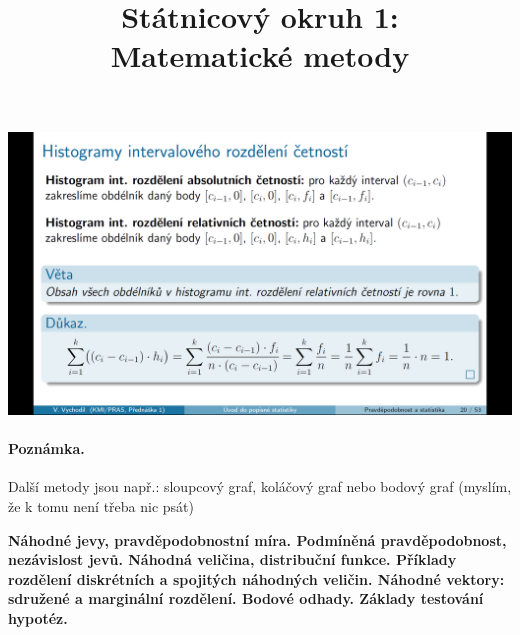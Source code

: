 \begin{center}
	\includegraphics[scale=0.32]{img/graficke_metody_intervalove_rozdeleni_histogramy}
\end{center}
\paragraph{Poznámka.} Další metody jsou např.: sloupcový graf, koláčový graf nebo bodový graf (myslím, že k tomu není třeba nic psát)



\newpage
\textbf{Náhodné jevy, pravděpodobnostní míra. Podmíněná pravděpodobnost, nezávislost jevů. Náhodná veličina, distribuční
funkce. Příklady rozdělení diskrétních a spojitých náhodných veličin. Náhodné vektory: sdružené a
marginální rozdělení. Bodové odhady. Základy testování hypotéz.}
\documentclass[12pt,a4paper]{article}
\usepackage[utf8x]{inputenc}
\usepackage[czech]{babel}
\usepackage[T1]{fontenc}
\setlength{\parskip}{12pt}
\usepackage{fullpage}
\setlength{\parskip}{6pt}
\usepackage{ amssymb }
\usepackage{ mathrsfs }
\usepackage{amsthm}
\usepackage{amsmath}
\usepackage{fixltx2e}
\newtheorem{definition}{Definice}
\newtheorem{sentence}{Věta}
\newtheorem{example}{Příklad}
\newtheorem{result}{Důsledek}
\usepackage{graphicx}
\usepackage{ dsfont }



\title{Státnicový okruh 1: \\ Matematické metody}
\maketitle
\newpage
\tableofcontents
\newpage
\textbf{Množiny, operace s množinami, kartézský součin množin, konečné, spočetné a nespočetné množiny. Číselné
množiny. Princip indukce. Relace a jejich vlastnosti, operace s relacemi, reprezentace relací. Binární relace na
množině, uzávěry relací, ekvivalence, rozklad na množině, uspořádané množiny. Zobrazení a jejich vlastnosti.}

